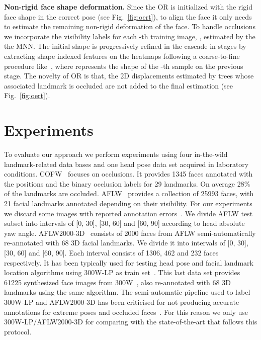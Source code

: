 \documentclass[9pt,technote,compsoc]{IEEEtran}
\begin{document}
\textbf{Non-rigid face shape deformation.} Since the OR is initialized with the rigid face shape in the correct pose  (see Fig.~\ref{fig:oert}), to align the face it only needs to estimate the remaining non-rigid deformation of the face. To handle occlusions we incorporate the visibility labels for each  -th training image, , estimated by the the MNN. The initial shape is progressively refined in the cascade in  stages by extracting shape indexed features on the heatmaps  following a coarse-to-fine procedure like~\cite{Valle19b}, where  represents the shape of the -th sample on the previous stage. The novelty of OR is that, the 2D displacements estimated by trees whose associated landmark is occluded are not added to the final estimation (see Fig.~\ref{fig:oert}).



\section{Experiments}
\label{sec:experiments}

To evaluate our approach we perform experiments using four in-the-wild landmark-related data bases and one head pose data set acquired in laboratory conditions.
COFW~\cite{Burgos13} focuses on occlusions. It provides 1345 faces annotated with the positions and the binary occlusion labels for 29 landmarks. On average 28\% of the landmarks are occluded. 
AFLW~\cite{Koestinger11} provides a collection of 25993 faces, with 21 facial landmarks annotated depending on their visibility. For our experiments we discard some images with reported annotation errors~\cite{Jin15}. We divide AFLW test subset into intervals of [0, 30], [30, 60] and [60, 90] according to head absolute yaw angle. 
AFLW2000-3D~\cite{Zhu17} consists of 2000 faces from AFLW semi-automatically re-annotated with 68 3D facial landmarks. We divide it into intervals of [0, 30], [30, 60] and [60, 90]. Each interval consists of 1306, 462 and 232 faces respectively. It has been typically used for testing head pose and facial landmark location algorithms using 300W-LP as train set~\cite{Zhu17}. This last data set provides 61225 synthesized face images from 300W~\cite{Sagonas16}, also re-annotated with 68 3D landmarks using the same algorithm.
The semi-automatic pipeline used to label 300W-LP and AFLW2000-3D has been criticised for not producing accurate annotations for extreme poses and occluded faces~\cite{Bulat17b}. For this reason we only use 300W-LP/AFLW2000-3D  for comparing with the state-of-the-art that follows this protocol.
\end{document}

